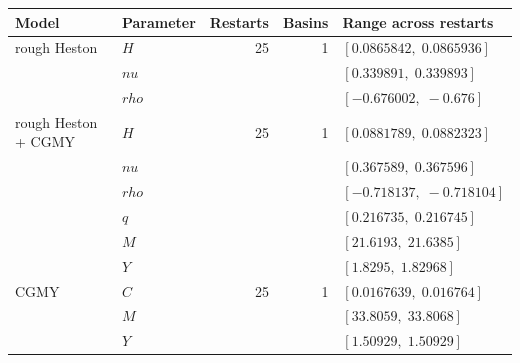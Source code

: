 \begin{tabular}{llrrl}
\toprule
Model & Parameter & Restarts & Basins & Range across restarts\\
\midrule
rough Heston & $H$ & 25 & 1 & $[0.0865842,\; 0.0865936]$\\
 & $nu$ &  &  & $[0.339891,\; 0.339893]$\\
 & $rho$ &  &  & $[-0.676002,\; -0.676]$\\
\addlinespace
rough Heston + CGMY & $H$ & 25 & 1 & $[0.0881789,\; 0.0882323]$\\
 & $nu$ &  &  & $[0.367589,\; 0.367596]$\\
 & $rho$ &  &  & $[-0.718137,\; -0.718104]$\\
 & $q$ &  &  & $[0.216735,\; 0.216745]$\\
 & $M$ &  &  & $[21.6193,\; 21.6385]$\\
 & $Y$ &  &  & $[1.8295,\; 1.82968]$\\
\addlinespace
CGMY & $C$ & 25 & 1 & $[0.0167639,\; 0.016764]$\\
 & $M$ &  &  & $[33.8059,\; 33.8068]$\\
 & $Y$ &  &  & $[1.50929,\; 1.50929]$\\
\bottomrule
\end{tabular}

